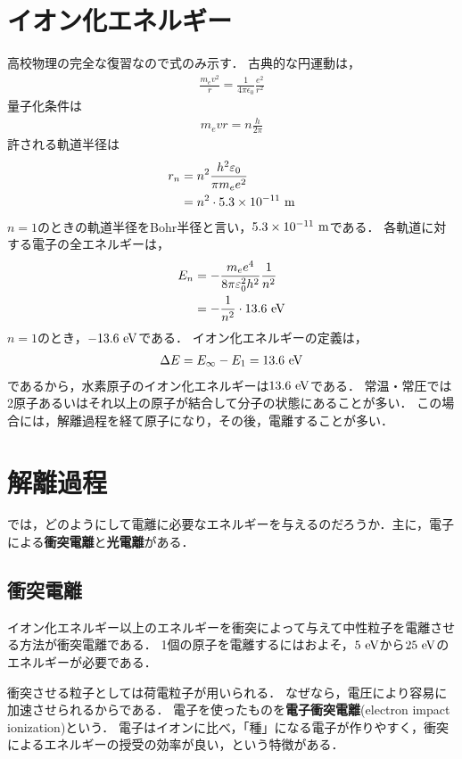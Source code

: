 \documentclass{report}
\begin{document}
  \section{イオン化エネルギー}
    高校物理の完全な復習なので式のみ示す．
    古典的な円運動は，
    \begin{align}
      \frac{m_ev^2}{r} = \frac{1}{4\pi\epsilon_0}\frac{e^2}{r^2}
    \end{align}
    量子化条件は
    \begin{align}
      m_e vr = n\frac{h}{2\pi}
    \end{align}
    許される軌道半径は
    \begin{align}
      r_n &= n^2 \frac{h^2\varepsilon_0}{\pi m_e e^2} \\ 
      &= n^2\cdot 5.3 \times 10^{-11}\ \mathrm{m}
    \end{align}
    $n = 1$のときの軌道半径をBohr半径と言い，$5.3 \times 10^{-11}\ \mathrm{m}$である．
    各軌道に対する電子の全エネルギーは，
    \begin{align}
      E_n &= -\frac{m_ee^4}{8\pi\varepsilon_0^2h^2}\frac{1}{n^2} \\ 
      &= -\frac{1}{n^2}\cdot 13.6\ \mathrm{eV} 
    \end{align}
    $n = 1$のとき，$-13.6\ \mathrm{eV}$である．
    イオン化エネルギーの定義は，
    \begin{align}
      \Delta E = E_{\infty} - E_1 = 13.6\ \mathrm{eV}
    \end{align}
    であるから，水素原子のイオン化エネルギーは$13.6\ \mathrm{eV}$である．
    常温・常圧では2原子あるいはそれ以上の原子が結合して分子の状態にあることが多い．
    この場合には，解離過程を経て原子になり，その後，電離することが多い．
  \section{解離過程}
    では，どのようにして電離に必要なエネルギーを与えるのだろうか．主に，電子による\textbf{衝突電離}と\textbf{光電離}がある．
    \subsection{衝突電離}
    イオン化エネルギー以上のエネルギーを衝突によって与えて中性粒子を電離させる方法が衝突電離である．
    1個の原子を電離するにはおよそ，$5\ \r{eV}$から$25\ \r{eV}$のエネルギーが必要である．
    \par
    衝突させる粒子としては荷電粒子が用いられる．
    なぜなら，電圧により容易に加速させられるからである．
    電子を使ったものを\textbf{電子衝突電離}(electron impact ionization)という．
    電子はイオンに比べ，「種」になる電子が作りやすく，衝突によるエネルギーの授受の効率が良い，という特徴がある．
\end{document}
